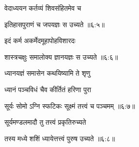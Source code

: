 {\devanagarifont वेदाध्ययन कर्तव्यं शिवसंहितमेव च  \danda\dontdisplaylinenum }%


{\devanagarifont इतिहासपुराणं च जपयज्ञः स उच्यते {॥६:५॥} \veg\dontdisplaylinenum }%


 

{\devanagarifont इदं कर्म अकर्मेदमूहापोहविशारदः \thinspace{\dandab} \dontdisplaylinenum }%


{\devanagarifont शास्त्रचक्षुः समालोक्य ज्ञानयज्ञः स उच्यते {॥६:६॥} \veg\dontdisplaylinenum }%


 

{\devanagarifont ध्यानयज्ञं समासेन कथयिष्यामि ते शृणु \thinspace{\dandab} \dontdisplaylinenum }%

{\devanagarifont ध्यानं पञ्चविधं चैव कीर्तितं हरिणा पुरा  \danda\dontdisplaylinenum }%


{\devanagarifont सूर्यः सोमो ऽग्नि स्फटिकः सूक्ष्मं तत्त्वं च पञ्चमम् {॥६:७॥} \veg\dontdisplaylinenum }%

{\devanagarifont सूर्यमण्डलमादौ तु तत्त्वं प्रकृतिरुच्यते \thinspace{\dandab} \dontdisplaylinenum }%
 

{\devanagarifont तस्य मध्ये शशिं ध्यायेत्तत्त्वं पुरुष उच्यते {॥६:८॥} \veg\dontdisplaylinenum }%

